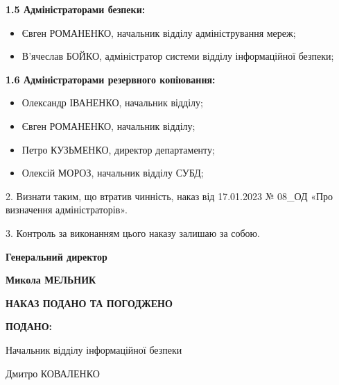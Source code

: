 \documentclass[12pt]{article}
\begin{document}
  \textbf{1.5 Адміністраторами безпеки:}
  \begin{itemize}
    
      \item Євген РОМАНЕНКО, начальник відділу адміністрування мереж;
    
      \item В'ячеслав БОЙКО, адміністратор системи відділу інформаційної безпеки;
    
  \end{itemize}

  \textbf{1.6 Адміністраторами резервного копіювання:}
  \begin{itemize}
    
      \item Олександр ІВАНЕНКО, начальник відділу;
    
      \item Євген РОМАНЕНКО, начальник відділу;
    
      \item Петро КУЗЬМЕНКО, директор департаменту;
    
      \item Олексій МОРОЗ, начальник відділу СУБД;
    
  \end{itemize}

2. Визнати таким, що втратив чинність, наказ від 17.01.2023 № 08\_\allowbreak{}ОД «Про визначення адміністраторів».

3. Контроль за виконанням цього наказу залишаю за собою.

\vspace{1.5cm}

\noindent
\parbox[t]{0.5\textwidth}{\bfseries Генеральний директор}%
\parbox[t]{0.5\textwidth}{\raggedleft{}\bfseries Микола МЕЛЬНИК}

\newpage

\begin{center}
  \textbf{НАКАЗ ПОДАНО ТА ПОГОДЖЕНО}
\end{center}

\vspace{0.8cm}

\noindent
\textbf{ПОДАНО:}

\vspace{0.5cm}
\noindent
\parbox[t]{0.5\textwidth}{Начальник відділу інформаційної безпеки}%
\parbox[t]{0.5\textwidth}{\raggedleft{} Дмитро КОВАЛЕНКО}
\end{document}
